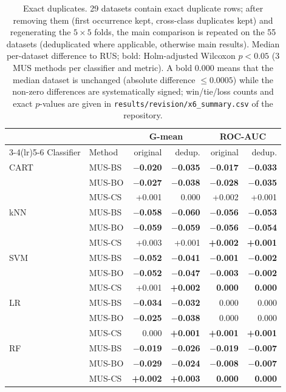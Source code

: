 \begin{table}[htbp]
\centering\footnotesize
\setlength{\tabcolsep}{4pt}
\caption{Exact duplicates. 29 datasets contain exact duplicate rows; after removing them (first occurrence kept, cross-class duplicates kept) and regenerating the $5\times5$ folds, the main comparison is repeated on the 55 datasets (deduplicated where applicable, otherwise main results). Median per-dataset difference to RUS; bold: Holm-adjusted Wilcoxon $p<0.05$ (3 MUS methods per classifier and metric). A bold 0.000 means that the median dataset is unchanged (absolute difference $\leq 0.0005$) while the non-zero differences are systematically signed; win/tie/loss counts and exact $p$-values are given in \texttt{results/revision/x6\_summary.csv} of the repository.}
\label{tab:x6}
\begin{tabular}{llrrrr}
\toprule
 & & \multicolumn{2}{c}{G-mean} & \multicolumn{2}{c}{ROC-AUC}\\
\cmidrule(lr){3-4}\cmidrule(lr){5-6}
Classifier & Method & original & dedup. & original & dedup.\\
\midrule
CART & MUS-BS & \textbf{$-$0.020} & \textbf{$-$0.035} & \textbf{$-$0.017} & \textbf{$-$0.033}\\
 & MUS-BO & \textbf{$-$0.027} & \textbf{$-$0.038} & \textbf{$-$0.028} & \textbf{$-$0.035}\\
 & MUS-CS & +0.001 & 0.000 & +0.002 & +0.001\\
\addlinespace
kNN & MUS-BS & \textbf{$-$0.058} & \textbf{$-$0.060} & \textbf{$-$0.056} & \textbf{$-$0.053}\\
 & MUS-BO & \textbf{$-$0.059} & \textbf{$-$0.059} & \textbf{$-$0.056} & \textbf{$-$0.054}\\
 & MUS-CS & +0.003 & +0.001 & \textbf{+0.002} & \textbf{+0.001}\\
\addlinespace
SVM & MUS-BS & \textbf{$-$0.052} & \textbf{$-$0.041} & \textbf{$-$0.001} & \textbf{$-$0.002}\\
 & MUS-BO & \textbf{$-$0.052} & \textbf{$-$0.047} & \textbf{$-$0.003} & \textbf{$-$0.002}\\
 & MUS-CS & +0.001 & \textbf{+0.002} & \textbf{0.000} & \textbf{0.000}\\
\addlinespace
LR & MUS-BS & \textbf{$-$0.034} & \textbf{$-$0.032} & 0.000 & 0.000\\
 & MUS-BO & \textbf{$-$0.025} & \textbf{$-$0.038} & 0.000 & 0.000\\
 & MUS-CS & 0.000 & \textbf{+0.001} & \textbf{+0.001} & \textbf{+0.001}\\
\addlinespace
RF & MUS-BS & \textbf{$-$0.019} & \textbf{$-$0.026} & \textbf{$-$0.019} & \textbf{$-$0.007}\\
 & MUS-BO & \textbf{$-$0.029} & \textbf{$-$0.024} & \textbf{$-$0.008} & \textbf{$-$0.007}\\
 & MUS-CS & \textbf{+0.002} & \textbf{+0.003} & \textbf{0.000} & \textbf{0.000}\\
\bottomrule
\end{tabular}
\end{table}
